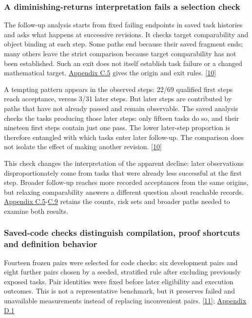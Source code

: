 \subsubsection[A diminishing-returns interpretation fails a selection check]{\texorpdfstring{\protect\hypertarget{r3-6}{}A diminishing-returns interpretation fails a selection check}{A diminishing-returns interpretation fails a selection check}}
The follow-up analysis starts from fixed failing endpoints in saved task histories and asks what happens at successive revisions. It checks target comparability and object binding at each step. Some paths end because their saved fragment ends; many others leave the strict comparison because target comparability has not been established. Such an exit does not itself establish task failure or a changed mathematical target. \href{en-appendix.pdf\#c5}{Appendix C.5} gives the origin and exit rules. \href{en.pdf\#ref-10}{\mbox{[10]}}

A tempting pattern appears in the observed steps: 22/69 qualified first steps reach acceptance, versus 3/31 later steps. But later steps are contributed by paths that have not already passed and remain observable. The saved analysis checks the tasks producing those later steps: only fifteen tasks do so, and their nineteen first steps contain just one pass. The lower later-step proportion is therefore entangled with which tasks enter later follow-up. The comparison does not isolate the effect of making another revision. \href{en.pdf\#ref-10}{\mbox{[10]}}

This check changes the interpretation of the apparent decline: later observations disproportionately come from tasks that were already less successful at the first step. Broader follow-up reaches more recorded acceptances from the same origins, but relaxing comparability answers a different question about reachable records. \href{en-appendix.pdf\#c5}{Appendix C.5}-\href{en-appendix.pdf\#c9}{C.9} retains the counts, risk sets and broader paths needed to examine both results.

\subsubsection[Saved-code checks distinguish compilation, proof shortcuts and definition behavior]{\texorpdfstring{\protect\hypertarget{r3-7}{}Saved-code checks distinguish compilation, proof shortcuts and definition behavior}{Saved-code checks distinguish compilation, proof shortcuts and definition behavior}}
Fourteen frozen pairs were selected for code checks: six development pairs and eight further pairs chosen by a seeded, stratified rule after excluding previously exposed tasks. Pair identities were fixed before later eligibility and execution outcomes. This is not a representative benchmark, but it preserves failed and unavailable measurements instead of replacing inconvenient pairs. \href{en.pdf\#ref-11}{\mbox{[11]}}; \href{en-appendix.pdf\#d1}{Appendix D.1}

